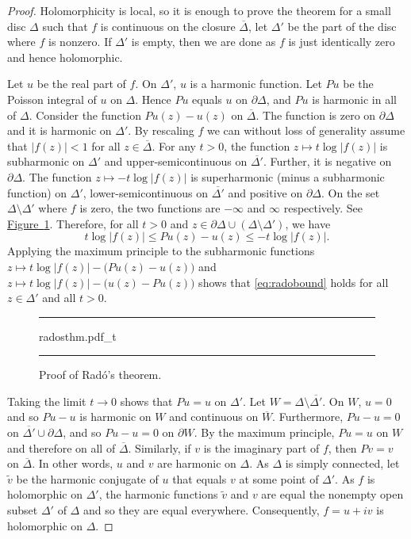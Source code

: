 \documentclass[12pt,openany]{book}
\newcommand{\abs}[1]{\left\lvert {#1} \right\rvert}
\theoremstyle{plain}
\theoremstyle{remark}
\theoremstyle{definition}
\newenvironment{myfig}{%
\begin{figure}[h!t]
\noindent\rule{\textwidth}{0.4pt}\vspace{12pt}\par\centering}%
{\par\noindent\rule{\textwidth}{0.4pt}
\end{figure}}
\theoremstyle{exercise}
\theoremstyle{example}
\newcommand{\figureref}[1]{\hyperref[#1]{Figure~\ref*{#1}}}
\begin{document}
\begin{proof}
Holomorphicity is local, so
it is enough to prove the theorem for a small disc $\Delta$
such that $f$ is continuous
on the closure $\overline{\Delta}$, let $\Delta'$ be the part of the disc
where $f$ is nonzero.  If $\Delta'$ is empty, then we are done as
$f$ is just identically zero and hence holomorphic.

Let $u$ be the real part of $f$.  On $\Delta'$, $u$ is a harmonic function.
Let $Pu$ be the Poisson integral of $u$ on $\Delta$.  Hence $Pu$
equals $u$ on $\partial \Delta$, and $Pu$ is harmonic in all of $\Delta$.
Consider the function
$Pu(z) - u(z)$ on $\overline{\Delta}$.  The function is zero
on $\partial \Delta$ and it is harmonic on $\Delta'$.  By rescaling $f$
we can without loss of generality assume that $\abs{f(z)} < 1$ for all $z
\in \overline{\Delta}$.  For any $t >0$, the function 
$z \mapsto t \log \abs{f(z)}$ is subharmonic on $\Delta'$ and
upper-semicontinuous on $\overline{\Delta'}$.  Further, it is negative
on $\partial \Delta$.  The function $z \mapsto -t \log \abs{f(z)}$ is
superharmonic (minus a subharmonic function) on $\Delta'$,
lower-semicontinuous on $\overline{\Delta'}$ and positive on $\partial
\Delta$.  On the set $\Delta \setminus \Delta'$ where $f$ is zero, the two functions are $-\infty$ and
$\infty$ respectively.
See \figureref{fig:radosthm}.
Therefore, for all $t > 0$ and 
$z \in \partial \Delta \cup (\Delta \setminus \Delta')$,
we have
\begin{equation} \label{eq:radobound}
t \log \abs{f(z)} \leq Pu(z)-u(z) \leq -t \log \abs{f(z)}  .
\end{equation}
Applying the maximum principle to the subharmonic functions
$z \mapsto t \log \abs{f(z)} - \bigl(Pu(z)-u(z)\bigr)$
and
$z \mapsto t \log \abs{f(z)} - \bigl(u(z)-Pu(z)\bigr)$
shows that 
\eqref{eq:radobound} holds for all $z \in \Delta'$ and all $t > 0$.

\begin{myfig}
{radosthm.pdf_t}
\caption{Proof of Rad\'o's theorem.\label{fig:radosthm}}
\end{myfig}

Taking the limit
$t \to 0$ shows that $Pu = u$ on $\Delta'$.
Let $W = \Delta \setminus \overline{\Delta'}$.
On $W$, $u=0$ and so $Pu-u$ is harmonic on $W$
and continuous on $\overline{W}$.  Furthermore,
$Pu-u=0$ on $\overline{\Delta'} \cup \partial \Delta$,
and so $Pu-u=0$ on $\partial W$.  By the maximum principle, $Pu=u$ on $W$
and therefore on all of $\overline{\Delta}$.
Similarly, if $v$ is the imaginary part of $f$, then $Pv = v$ on
$\overline{\Delta}$.
In other words, $u$ and $v$ are harmonic on $\Delta$.
As $\Delta$ is simply connected,
let $\tilde{v}$ be the harmonic conjugate of $u$ that equals $v$ at
some point of $\Delta'$.  As $f$ is holomorphic on $\Delta'$,
the harmonic functions $\tilde{v}$ and $v$
are equal the nonempty open subset $\Delta'$ of $\Delta$ and so
they are equal everywhere.  Consequently, $f = u +iv$ is holomorphic on
$\Delta$.
\end{proof}
\end{document}
